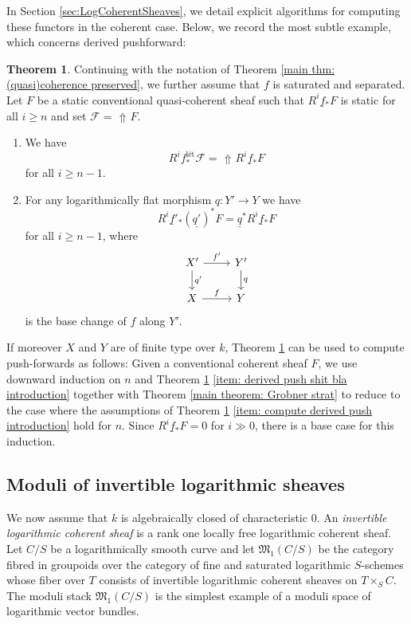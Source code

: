 \documentclass[11pt]{amsart}
\theoremstyle{definition}
\theoremstyle{definition}
\newtheorem{maintheorem}{Theorem}
\DeclareMathOperator{\arrowup}{\!\Uparrow \!}
\begin{document}
In Section \ref{sec:LogCoherentSheaves}, we detail explicit algorithms for computing these functors in the coherent case. Below, we record the most subtle example, which concerns derived pushforward:
    
\begin{maintheorem}\label{main thm: main theorem push forward}
Continuing with the notation of Theorem \ref{main thm: (quasi)coherence preserved}, we further assume that $f$ is saturated and separated. Let $F$ be a static conventional quasi-coherent sheaf such that $R^{i}\underline{f}{}_*F$ is static for all $i\geq n$ and set $\mathcal{F} = \arrowup F$. 
\begin{enumerate}
    \item\label{item: compute derived push introduction} We have $$R^{i}f^{\text{l\'et}}_*\mathcal{F}=\arrowup R^{i}\underline{f}{}_*F $$ for all $i\geq n-1$. 
    \item\label{item: derived push shit bla introduction} For any logarithmically flat morphism $q\colon Y'\rightarrow Y$ we have $$R^{i}\underline{f}'{}_* (\underline{q'})^*F = \underline{q}^*R^{i}\underline{f}{}_*F$$ for all $i\geq n-1$, where 
        \begin{equation*}
            \begin{tikzcd}
                X'\dar["q'"] \rar["f'"] &Y'\dar["q"]\\
                X\rar["f"]&Y
            \end{tikzcd}
        \end{equation*}
        is the base change of $f$ along $Y'$.
    \end{enumerate}
\end{maintheorem}

If moreover $X$ and $Y$ are of finite type over $k$, Theorem \ref{main thm: main theorem push forward} can be used to compute push-forwards as follows: Given a conventional coherent sheaf $F$, we use downward induction on $n$ and Theorem \ref{main thm: main theorem push forward} \eqref{item: derived push shit bla introduction} together with Theorem \ref{main theorem: Grobner strat} to reduce to the case where the assumptions of Theorem \ref{main thm: main theorem push forward} \eqref{item: compute derived push introduction} hold for $n$. Since $R^i\underline{f}{}_*F=0$ for $i\gg 0$, there is a base case for this induction.


\subsection{Moduli of invertible logarithmic sheaves} We now assume that $k$ is algebraically closed of characteristic $0$.
An \textit{invertible logarithmic coherent sheaf} is a rank one locally free logarithmic coherent sheaf. Let $C/S$ be a logarithmically smooth curve and let $\mathfrak{M}_1(C/S)$ be the category fibred in groupoids over the category of fine and saturated logarithmic $S$-schemes whose fiber over $T$ consists of invertible logarithmic coherent sheaves on $T\times_S C$. The moduli stack $\mathfrak{M}_1(C/S)$ is the simplest example of a moduli space of logarithmic vector bundles.
\end{document}
